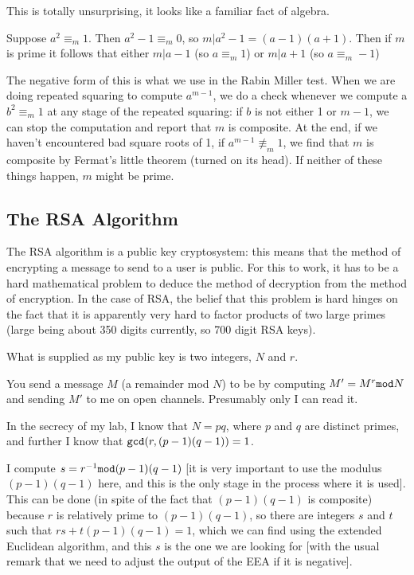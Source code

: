 \documentclass[12pt]{article}
\begin{document}
\begin{description}
This is totally unsurprising, it looks like a familiar fact of algebra.

Suppose $a^2 \equiv_m 1$.  Then $a^2-1 \equiv_m 0$, so $m|a^2-1 = (a-1)(a+1)$.  Then if $m$ is prime it follows
that either $m|a-1$ (so $a \equiv_m 1$) or $m|a+1$ (so $a \equiv_m -1$)

The negative form of this is what we use in the Rabin Miller test.  When we are doing repeated squaring to compute $a^{m-1}$, we do a 
check whenever we compute a $b^2 \equiv_m 1$ at any stage of the repeated squaring:  if $b$ is not either 1 or $m-1$, we can stop the computation and report that $m$ is composite.  At the end, if we haven't encountered bad square roots of 1,
if $a^{m-1}\not\equiv_m 1$, we find that $m$ is composite by Fermat's little theorem (turned on its head).  If neither
of these things happen, $m$ might be prime.


\end{description}

\subsection{The RSA Algorithm}

The RSA algorithm is a public key cryptosystem:  this means that the method of encrypting a message to send to a user is public.  For this to work, it has to be a hard mathematical problem to deduce the method of decryption from the method of encryption.  In the case of RSA, the belief that this problem is hard hinges on the fact that it is apparently very hard to factor products of two large primes (large being about 350 digits currently, so 700 digit RSA keys).

What is supplied as my public key is two integers, $N$ and $r$.

You send a message $M$ (a remainder mod $N$) to be by computing $M' = M^r {\tt mod} N$ and sending $M'$ to me on open channels.  Presumably only I can read it.

In the secrecy of my lab, I know that $N=pq$, where $p$ and $q$ are distinct primes, and further I know that
${\tt gcd}(r,(p-1)(q-1)) = 1$.

I compute $s = r^{-1} {\tt mod} (p-1)(q-1)$ [it is very important to use the modulus $(p-1)(q-1)$ here, and this is the only stage in the process where it is used].   This can be done (in spite of the fact that $(p-1)(q-1)$ is composite) because $r$ is relatively prime to $(p-1)(q-1)$, so there are integers $s$ and $t$ such that $rs + t(p-1)(q-1) = 1$,
which we can find using the extended Euclidean algorithm,  and this $s$ is the one we are looking for [with the usual remark that we need to adjust the output of the EEA if it is negative].
\end{document}
